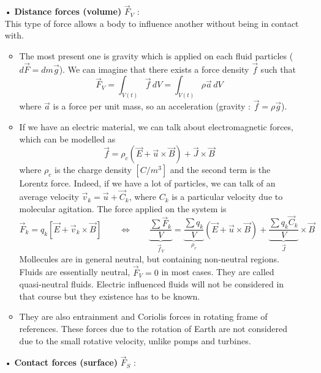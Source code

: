 	\begin{itemize}
		\item[•] \textbf{Distance forces (volume)} $\vec{F}_V$ : \\
		This type of force allows a body to influence another without being in contact with. 
		\begin{itemize}
			\item The most present one is gravity which is applied on each fluid particles ($d\vec{F} = dm \vec{g}$). We can imagine that there exists a force density $\vec{f}$ such that 
		\begin{equation}
			\vec{F}_V = \int _{V(t)} \vec{f} \, dV = \int _{V(t)} \rho \vec{a} \, dV
			\label{eq:1.25}
		\end{equation}
		where $\vec{a}$ is a force per unit mass, so an acceleration (gravity : $\vec{f} = \rho \vec{g}$). 
		
			\item If we have an electric material, we can talk about electromagnetic forces, which can be modelled as 
		\begin{equation}
			\vec{f} = \rho _c (\vec{E}+\vec{u}\times \vec{B}) + \vec{J}\times \vec{ B}
		\end{equation}
		where $\rho _c$ is the charge density $[C/m^3]$ and the second term is the Lorentz force. Indeed, if we have a lot of particles, we can talk of an average velocity $\vec{v}_k = \vec{u}+\vec{C}_k$, where $C_k$ is a particular velocity due to molecular agitation.  The force applied on the system is 
		\begin{equation}
			\vec{F}_k = q_k [\vec{E} + \vec{v}_k \times \vec{B}] \qquad \Leftrightarrow \qquad \underbrace{\frac{\sum \vec{F}_k}{V}}_{\vec{f}_V} = \underbrace{\frac{\sum q_k}{V}}_{\rho_c} (\vec{E}+\vec{u}\times \vec{B}) + \underbrace{\frac{\sum q_k \vec{C}_k}{V}}_{\vec{J}} \times \vec{B}
		\end{equation}
		Mollecules are in general neutral, but containing non-neutral regions. Fluids are essentially neutral, $\vec{F}_V = 0$ in most cases. They are called quasi-neutral fluids. Electric influenced fluids will not be considered in that course but they existence has to be known. 
		
			\item They are also entrainment and Coriolis forces in rotating frame of references. These forces due to the rotation of Earth are not considered due to the small rotative velocity, unlike pomps and turbines. \\
		\end{itemize}
		\item[•] \textbf{Contact forces (surface)} $\vec{F}_S$ : \\
		

\end{itemize}
